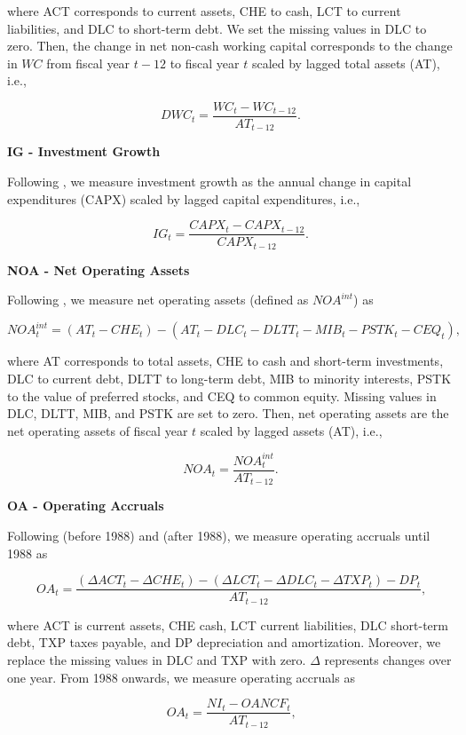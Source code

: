 \documentclass[
  article]{jss}
\begin{document}
where ACT corresponds to current assets, CHE to cash, LCT to current
liabilities, and DLC to short-term debt. We set the missing values in
DLC to zero. Then, the change in net non-cash working capital
corresponds to the change in \(WC\) from fiscal year \(t-12\) to fiscal
year \(t\) scaled by lagged total assets (AT), i.e.,

\[
DWC_{t} = \frac{WC_{t} - WC_{t-12}}{AT_{t-12}}\text{.}
\]

\textbf{IG - Investment Growth}

Following \citet{xing.2008}, we measure investment growth as the annual
change in capital expenditures (CAPX) scaled by lagged capital
expenditures, i.e.,

\[
IG_{t} = \frac{CAPX_{t} - CAPX_{t-12}}{CAPX_{t-12}}\text{.}
\]

\textbf{NOA - Net Operating Assets}

Following \citet{hirshleifer.2004}, we measure net operating assets
(defined as \(NOA^{int}\)) as

\[
NOA^{int}_{t} = (AT_{t} - CHE_{t}) - (AT_{t} - DLC_{t} - DLTT_{t} - MIB_{t} - PSTK_{t} - CEQ_{t})\text{,}
\]

where AT corresponds to total assets, CHE to cash and short-term
investments, DLC to current debt, DLTT to long-term debt, MIB to
minority interests, PSTK to the value of preferred stocks, and CEQ to
common equity. Missing values in DLC, DLTT, MIB, and PSTK are set to
zero. Then, net operating assets are the net operating assets of fiscal
year \(t\) scaled by lagged assets (AT), i.e.,

\[
NOA_{t} = \frac{NOA^{int}_{t}}{AT_{t-12}}\text{.}
\]

\textbf{OA - Operating Accruals}

Following \citet{sloan.1996} (before 1988) and \citet{hribar.2002}
(after 1988), we measure operating accruals until 1988 as

\[
OA_{t} = \frac{(\Delta ACT_{t} - \Delta CHE_{t}) - (\Delta LCT_{t} - \Delta DLC_{t} - \Delta TXP_{t}) -DP_{t}}{AT_{t-12}}\text{,}
\]

where ACT is current assets, CHE cash, LCT current liabilities, DLC
short-term debt, TXP taxes payable, and DP depreciation and
amortization. Moreover, we replace the missing values in DLC and TXP
with zero. \(\Delta\) represents changes over one year. From 1988
onwards, we measure operating accruals as

\[
OA_{t} = \frac{NI_{t} - OANCF_{t}}{AT_{t-12}}\text{,}
\]
\end{document}
